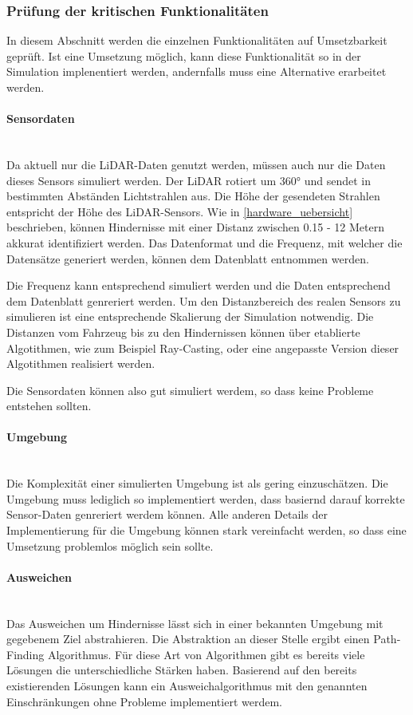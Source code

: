 \subsubsection{Prüfung der kritischen Funktionalitäten}
\label{pr}

In diesem Abschnitt werden die einzelnen Funktionalitäten auf Umsetzbarkeit geprüft. 
Ist eine Umsetzung möglich, kann diese Funktionalität so in der Simulation implenentiert werden, andernfalls muss eine Alternative erarbeitet werden.

\paragraph{Sensordaten} \mbox{}\\
Da aktuell nur die LiDAR-Daten genutzt werden, müssen auch nur die Daten dieses Sensors simuliert werden.
Der LiDAR rotiert um 360° und sendet in bestimmten Abständen Lichtstrahlen aus. 
Die Höhe der gesendeten Strahlen entspricht der Höhe des LiDAR-Sensors.
Wie in \ref{hardware_uebersicht} beschrieben, können Hindernisse mit einer Distanz zwischen 0.15 - 12 Metern akkurat identifiziert werden. 
Das Datenformat und die Frequenz, mit welcher die Datensätze generiert werden, können dem Datenblatt \cite{Slamtec2020} entnommen werden.

Die Frequenz kann entsprechend simuliert werden und die Daten entsprechend dem Datenblatt genreriert werden. 
Um den Distanzbereich des realen Sensors zu simulieren ist eine entsprechende Skalierung der Simulation notwendig.
Die Distanzen vom Fahrzeug bis zu den Hindernissen können über etablierte Algotithmen, wie zum Beispiel Ray-Casting, 
oder eine angepasste Version dieser Algotithmen realisiert werden.

Die Sensordaten können also gut simuliert werdem, so dass keine Probleme entstehen sollten.

\paragraph{Umgebung} \mbox{}\\
Die Komplexität einer simulierten Umgebung ist als gering einzuschätzen.
Die Umgebung muss lediglich so implementiert werden, dass basiernd darauf korrekte Sensor-Daten genreriert werdem können.
Alle anderen Details der Implementierung für die Umgebung können stark vereinfacht werden, so dass eine Umsetzung problemlos möglich sein sollte.

\paragraph{Ausweichen} \mbox{}\\
Das Ausweichen um Hindernisse lässt sich in einer bekannten Umgebung mit gegebenem Ziel abstrahieren. 
Die Abstraktion an dieser Stelle ergibt einen Path-Finding Algorithmus. 
Für diese Art von Algorithmen gibt es bereits viele Lösungen die unterschiedliche Stärken haben.
Basierend auf den bereits existierenden Lösungen kann ein Ausweichalgorithmus mit den genannten Einschränkungen ohne Probleme implementiert werdem. 

